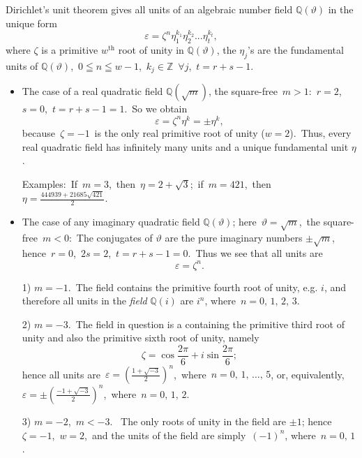 \documentclass[12pt]{article}
\begin{document}
Dirichlet's unit theorem gives all units of an algebraic number field $\mathbb{Q}(\vartheta)$ in the unique form
   $$\varepsilon = \zeta^{n}\eta_1^{k_1}\eta_2^{k_2}...\eta_t^{k_t},$$
where $\zeta$ is a primitive $w^\mathrm{th}$ root of unity in $\mathbb{Q}(\vartheta)$, the $\eta_j$'s are the fundamental units of $\mathbb{Q}(\vartheta)$,\, $0 \leqq n \leqq w\!-\!1$,\, $k_j \in \mathbb{Z}$\, $\forall j$,\, $t = r\!+\!s\!-\!1$.

\begin{itemize}

\item The case of a real quadratic field $\mathbb{Q}(\sqrt{m})$, the square-free \,$m > 1$:\, $r = 2$,\, $s = 0$,\, $t = r\!+\!s\!-\!1 = 1$.\, So we obtain
     $$\varepsilon = \zeta^{n}\eta^{k} = \pm\eta^{k},$$ 
because\, $\zeta= -1$\, is the only real primitive root of unity ($w = 2$).\, Thus, every real quadratic field has infinitely many units and a unique fundamental unit $\eta$.

Examples:\, If\, $m = 3$,\, then\, $\eta = 2\!+\!\sqrt{3}$;\, if\, $m = 421$,\, then\, $\eta = \frac{444939+21685\sqrt{421}}{2}$.

\item The case of any imaginary quadratic field $\mathbb{Q}(\vartheta)$; here\, $\vartheta = \sqrt{m}$,\, the square-free\, $m < 0$:\, The conjugates of $\vartheta$ are the pure imaginary numbers $\pm\sqrt{m}$, hence\, $r = 0$,\, $2s = 2$,\, $t = r\!+\!s\!-\!1 = 0$.\, Thus we see that all units are 
                     $$\varepsilon = \zeta^{n}.$$

1) $m = -1$.\, The field contains the primitive fourth root of unity, e.g. $i$, and therefore all units in the {\em {} field} $\mathbb{Q}(i)$ are $i^n$, where\, $n = 0,\,1,\,2,\,3$.

2) $m = -3$.\, The field in question is a  containing the primitive third root of unity and also the primitive sixth root of unity, namely
           $$\zeta = \cos{\frac{2\pi}{6}}+i\sin{\frac{2\pi}{6}};$$
hence all units are\, $\varepsilon = (\frac{1+\sqrt{-3}}{2})^{n}$,\, where\, $n = 0,\,1,\,\ldots,\,5$, or, equivalently,
\, $\varepsilon = \pm(\frac{-1+\sqrt{-3}}{2})^{n}$,\, where\, 
$n = 0,\,1,\,2$.

3) $m = -2$,\, $m <-3$. \, The only roots of unity in the field are $\pm 1$; hence\, $\zeta = -1$,\, $w = 2$,\, and the units of the field are simply\,
 $(-1)^{n}$, where\, $n = 0,\,1$.
                   
\end{itemize}
\end{document}

